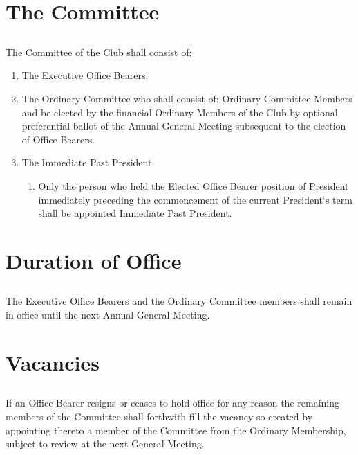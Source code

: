 \documentclass[10.5pt]{article}
\begin{document}
\section{The Committee}
\subsection{} The Committee of the Club shall consist of:
\begin{enumerate}[label=(\alph*)]
    \item The Executive Office Bearers;
    \item The Ordinary Committee who shall consist of: Ordinary Committee Members and be elected by the financial Ordinary Members of the Club by optional preferential ballot of the Annual General Meeting subsequent to the election of Office Bearers.
    \item The Immediate Past President.
    \begin{enumerate}[label=(\roman*)]
        \item Only the person who held the Elected Office Bearer position of President immediately preceding the commencement of the current President‘s term shall be appointed Immediate Past President. 
        \newline
    \end{enumerate}
\end{enumerate}


\section{Duration of Office}
\subsection{} The Executive Office Bearers and the Ordinary Committee members shall remain in office until the next Annual General Meeting.
\newline


\section{Vacancies}
\subsection{} If an Office Bearer resigns or ceases to hold office for any reason the remaining members of the Committee shall forthwith fill the vacancy so created by appointing thereto a member of the Committee from the Ordinary Membership, subject to review at the next General Meeting.
\newline
\end{document}
